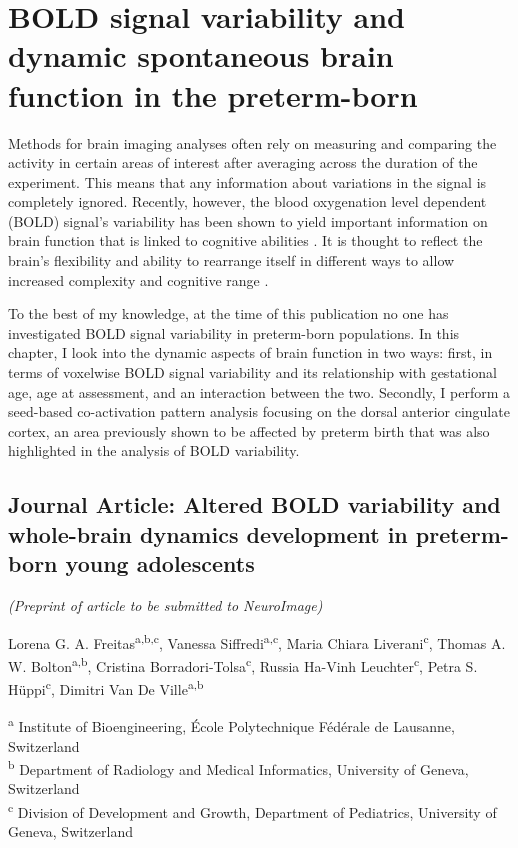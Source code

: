 \chapter{BOLD signal variability and dynamic spontaneous brain function in the preterm-born}\label{chapter:ch3}

\vspace{2cm}
Methods for brain imaging analyses often rely on measuring and comparing the activity in certain areas of interest after averaging across the duration of the experiment. This means that any information about variations in the signal is completely ignored. Recently, however, the blood oxygenation level dependent (BOLD) signal's variability has been shown to yield important information on brain function that is linked to cognitive abilities \citep{Garrett2013b}. It is thought to reflect the brain's flexibility and ability to rearrange itself in different ways to allow increased complexity and cognitive range \citep{Deco2011}.

To the best of my knowledge, at the time of this publication no one has investigated BOLD signal variability in preterm-born populations. In this chapter, I look into the dynamic aspects of brain function in two ways: first, in terms of voxelwise BOLD signal variability and its relationship with gestational age, age at assessment, and an interaction between the two. Secondly, I perform a seed-based co-activation pattern analysis focusing on the dorsal anterior cingulate cortex, an area previously shown to be affected by preterm birth that was also highlighted in the analysis of BOLD variability. 



\clearpage

\section{Journal Article: Altered BOLD variability and whole-brain dynamics development in preterm-born young adolescents} \label{section:ch3_BOLDvar_paper}

\begin{center}
 \textit{(Preprint of article to be submitted to NeuroImage)}
 
Lorena G. A. Freitas\textsuperscript{a,b,c}, 
Vanessa Siffredi\textsuperscript{a,c}, 
Maria Chiara Liverani\textsuperscript{c}, 
Thomas A. W. Bolton\textsuperscript{a,b},
Cristina Borradori-Tolsa\textsuperscript{c}, 
Russia Ha-Vinh Leuchter\textsuperscript{c},
Petra S. Hüppi\textsuperscript{c},
Dimitri Van De Ville\textsuperscript{a,b}
\end{center}
\textsuperscript{a} Institute of Bioengineering, École Polytechnique Fédérale de Lausanne, Switzerland \\
\textsuperscript{b} Department of Radiology and Medical Informatics, University of Geneva, Switzerland \\
\textsuperscript{c} Division of Development and Growth, Department of Pediatrics, University of Geneva, Switzerland \\

